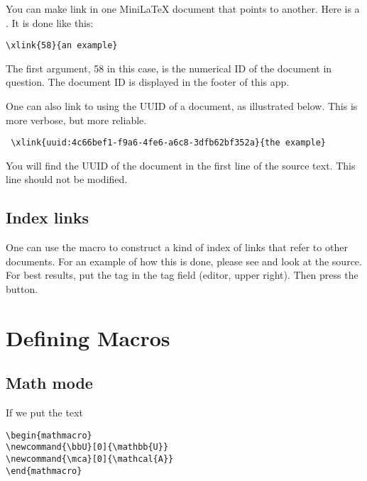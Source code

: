 You can make link in one MiniLaTeX document that points to another.
Here is a . It is done like this:

\begin{verbatim}
\xlink{58}{an example}
\end{verbatim}

The first argument, 58 in this case, is the numerical ID of the document in question. The document ID is displayed in the footer of this app.

One can also link to   using the UUID of a document, as illustrated below.  This is more verbose, but more reliable.


\begin{verbatim}
 \xlink{uuid:4c66bef1-f9a6-4fe6-a6c8-3dfb62bf352a}{the example}
\end{verbatim}


You will find the UUID of the document in the first line of the source text.  This line should not be modified.


\subsection{Index links}

One can use the  macro to construct a kind of index of links that refer to other documents.  For an example of how this is done, please see  and look at the source. For best results, put the tag  in the tag field (editor, upper right).  Then press the  button.

\section{Defining Macros}

\subsection{Math mode}

If we put the text

\begin{verbatim}
\begin{mathmacro}
\newcommand{\bbU}[0]{\mathbb{U}}
\newcommand{\mca}[0]{\mathcal{A}}
\end{mathmacro}
\end{verbatim}


\begin{mathmacro}
\newcommand{\bbU}[0]{\mathbb{U}}
\newcommand{\mca}[0]{\mathcal{A}}
\end{mathmacro}

